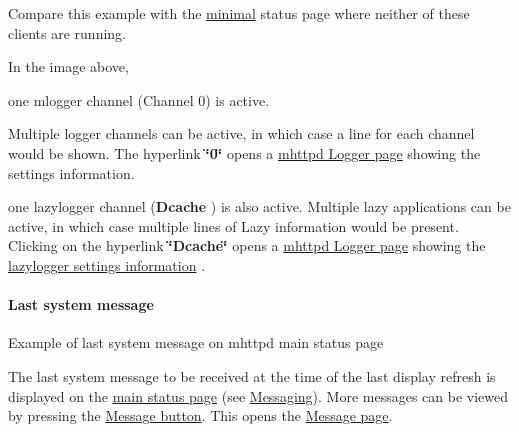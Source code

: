Compare this example with the \hyperlink{RC_mhttpd_utility_RC_mhttpd_minimal_status_page}{minimal} status page where neither of these clients are running.

\par
 In the image above,
\begin{DoxyItemize}
\item one mlogger channel (Channel 0) is active. \par
Multiple logger channels can be active, in which case a line for each channel would be shown. The hyperlink {\bfseries \char`\"{}0\char`\"{}} opens a \hyperlink{RC_mhttpd_Logger_page}{mhttpd Logger page} showing the settings information.
\item one lazylogger channel ({\bfseries Dcache} ) is also active. Multiple lazy applications can be active, in which case multiple lines of Lazy information would be present. Clicking on the hyperlink {\bfseries \char`\"{}Dcache\char`\"{}} opens a \hyperlink{RC_mhttpd_Logger_page}{mhttpd Logger page} showing the \hyperlink{RC_mhttpd_Logger_page_RC_mhttpd_Logger_lazylogger}{lazylogger settings information} .
\end{DoxyItemize}

\par


\par
 \label{RC_mhttpd_status_page_features_idx_message_last}
\hypertarget{RC_mhttpd_status_page_features_idx_message_last}{}
 \hypertarget{RC_mhttpd_status_page_features_RC_mhttpd_status_latest_msg}{}\paragraph{Last system message}\label{RC_mhttpd_status_page_features_RC_mhttpd_status_latest_msg}
\begin{center} Example of last system message on mhttpd main status page \par
\par
\par
  \end{center}  \par


The last system message to be received at the time of the last display refresh is displayed on the \hyperlink{RC_mhttpd_Main_Status_page_RC_mhttpd_main_status}{main status page} (see \hyperlink{F_Messaging}{Messaging}). More messages can be viewed by pressing the \hyperlink{RC_mhttpd_status_page_features_RC_mhttpd_status_Page_buttons}{Message button}. This opens the \hyperlink{RC_mhttpd_Message_page}{Message page}.

